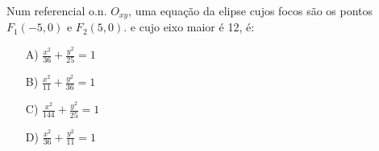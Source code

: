 Num referencial o.n. $O_{xy}$, uma equação da elipse cujos focos são os pontos $F_1(-5,0)$ e $F_2(5,0)$. e cujo eixo maior é 12, é:
\begin{enumerate}
\item [A)] $\frac{x^2}{36} + \frac{y^2}{25} = 1$
\item [B)] $\frac{x^2}{11} + \frac{y^2}{36} = 1$
\item [C)] $\frac{x^2}{144} + \frac{y^2}{25} = 1$
\item [D)] $\frac{x^2}{36} + \frac{y^2}{11} = 1$
\end{enumerate}